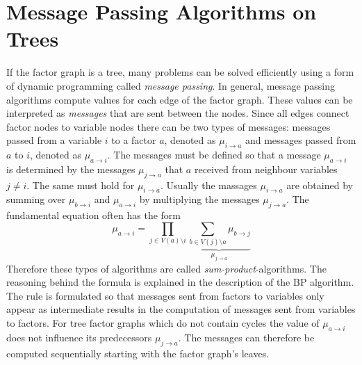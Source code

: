 
\section{Message Passing Algorithms on Trees}

If the factor graph is a tree, many problems can be solved efficiently using a form of dynamic programming called \emph{message passing}. \newline 
In general, message passing algorithms compute values for each edge of the factor graph. These values can be interpreted as \emph{messages} that are sent between the nodes. Since all edges connect factor nodes to variable nodes there can be two types of messages: messages passed from a variable $i$ to a factor $a$, denoted as $\mu_{i \rightarrow a}$ and messages passed from $a$ to $i$, denoted as $\mu_{a \rightarrow i}$. \newline
The messages must be defined so that a message $\mu_{a \rightarrow i}$ is determined by the messages $\mu_{j \rightarrow a}$ that $a$ received from neighbour variables $j \neq i$. 
The same must hold for $\mu_{i \rightarrow a}$. \newline
Usually the massages $\mu_{i \rightarrow a}$ are obtained by summing over $\mu_{b \rightarrow i}$ and $\mu_{a \rightarrow i}$ by multiplying the messages $\mu_{j \rightarrow a}$. The fundamental equation often has the form $$\mu_{a \rightarrow i} = \prod_{j \in V(a) \setminus i} \underbrace{\sum_{b \in V(j) \setminus a} \mu_{b \rightarrow j}}_{\mu_{j \rightarrow a}}$$ Therefore these types of algorithms are called \emph{sum-product}-algorithms. The reasoning behind the formula is explained in the description of the BP algorithm. The rule is formulated so that messages sent from factors to variables only appear as intermediate results in the computation of messages sent from variables to factors. \newline
For tree factor graphs which do not contain cycles the value of $\mu_{a \rightarrow i}$ does not influence its predecessors $\mu_{j \rightarrow a}$. The messages can therefore be computed sequentially starting with the factor graph's leaves.


